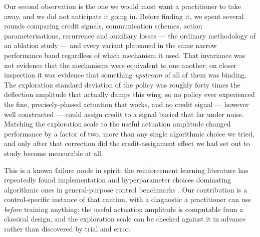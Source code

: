 \documentclass[preprint,11pt,authoryear]{elsarticle}
\begin{document}
Our second observation is the one we would most want a practitioner to take away,
and we did not anticipate it going in. Before finding it, we spent several
rounds comparing credit signals, communication schemes, action
parameterisations, recurrence and auxiliary losses --- the ordinary methodology
of an ablation study --- and every variant plateaued in the same narrow
performance band regardless of which mechanism it used. That invariance was not
evidence that the mechanisms were equivalent to one another; on closer
inspection it was evidence that something \emph{upstream} of all of them was
binding. The exploration standard deviation of the policy was roughly forty
times the deflection amplitude that actually damps this wing, so no policy ever
experienced the fine, precisely-phased actuation that works, and no credit
signal --- however well constructed --- could assign credit to a signal buried
that far under noise. Matching the exploration scale to the useful actuation
amplitude changed performance by a factor of two, more than any single
algorithmic choice we tried, and only after that correction did the
credit-assignment effect we had set out to study become measurable at all.

This is a known failure mode in spirit: the reinforcement learning literature has
repeatedly found implementation and hyperparameter choices dominating
algorithmic ones in general-purpose control benchmarks
\citep{henderson2018matters,engstrom2020implementation,andrychowicz2021what}. Our
contribution is a control-specific instance of that caution, with a diagnostic a
practitioner can use \emph{before} training anything: the useful actuation
amplitude is computable from a classical design, and the exploration scale can be
checked against it in advance rather than discovered by trial and error.
\end{document}
